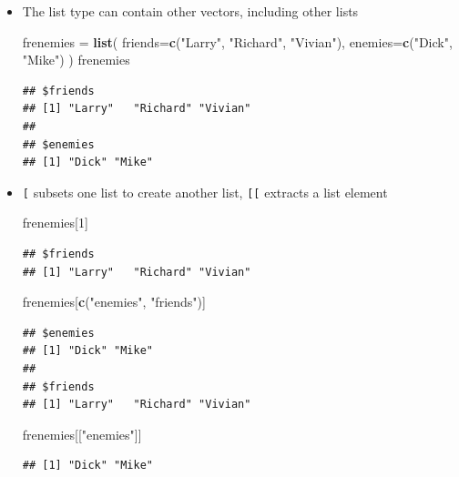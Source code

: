\documentclass[]{article}
\newenvironment{Shaded}{\begin{snugshade}}{\end{snugshade}}
\newcommand{\KeywordTok}[1]{\textcolor[rgb]{0.13,0.29,0.53}{\textbf{#1}}}
\newcommand{\DataTypeTok}[1]{\textcolor[rgb]{0.13,0.29,0.53}{#1}}
\newcommand{\DecValTok}[1]{\textcolor[rgb]{0.00,0.00,0.81}{#1}}
\newcommand{\StringTok}[1]{\textcolor[rgb]{0.31,0.60,0.02}{#1}}
\newcommand{\NormalTok}[1]{#1}
\theoremstyle{definition}
\theoremstyle{definition}
\theoremstyle{remark}
\begin{document}
\begin{itemize}
\item
  The list type can contain other vectors, including other lists

\begin{Shaded}
\begin{Highlighting}[]
\NormalTok{frenemies =}\StringTok{ }\KeywordTok{list}\NormalTok{(}
    \DataTypeTok{friends=}\KeywordTok{c}\NormalTok{(}\StringTok{"Larry"}\NormalTok{, }\StringTok{"Richard"}\NormalTok{, }\StringTok{"Vivian"}\NormalTok{),}
    \DataTypeTok{enemies=}\KeywordTok{c}\NormalTok{(}\StringTok{"Dick"}\NormalTok{, }\StringTok{"Mike"}\NormalTok{)}
\NormalTok{)}
\NormalTok{frenemies}
\end{Highlighting}
\end{Shaded}

\begin{verbatim}
## $friends
## [1] "Larry"   "Richard" "Vivian" 
## 
## $enemies
## [1] "Dick" "Mike"
\end{verbatim}
\item
  \texttt{{[}} subsets one list to create another list, \texttt{{[}{[}}
  extracts a list element

\begin{Shaded}
\begin{Highlighting}[]
\NormalTok{frenemies[}\DecValTok{1}\NormalTok{]}
\end{Highlighting}
\end{Shaded}

\begin{verbatim}
## $friends
## [1] "Larry"   "Richard" "Vivian"
\end{verbatim}

\begin{Shaded}
\begin{Highlighting}[]
\NormalTok{frenemies[}\KeywordTok{c}\NormalTok{(}\StringTok{"enemies"}\NormalTok{, }\StringTok{"friends"}\NormalTok{)]}
\end{Highlighting}
\end{Shaded}

\begin{verbatim}
## $enemies
## [1] "Dick" "Mike"
## 
## $friends
## [1] "Larry"   "Richard" "Vivian"
\end{verbatim}

\begin{Shaded}
\begin{Highlighting}[]
\NormalTok{frenemies[[}\StringTok{"enemies"}\NormalTok{]]}
\end{Highlighting}
\end{Shaded}

\begin{verbatim}
## [1] "Dick" "Mike"
\end{verbatim}
\end{itemize}
\end{document}
